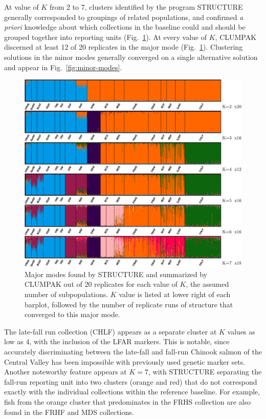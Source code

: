 At value of $K$ from 2 to 7, clusters identified by the program STRUCTURE
generally corresponded to groupings of related populations, and confirmed
{\em a priori} knowledge about which collections in the baseline could and should be
grouped together into reporting units (Fig.~\ref{fig:struct}).  At every value of $K$, CLUMPAK discerned at least
12 of 20 replicates in the major mode (Fig.~\ref{fig:struct}).   
Clustering solutions in the minor
modes generally converged on a single alternative solution and appear in Fig.~\ref{fig:minor-modes}.
\begin{figure}
\newcommand{\structcap}{\footnotesize Major modes found by STRUCTURE and summarized
by CLUMPAK out of 20 replicates for each value of $K$, the assumed number of
subpopulations. $K$ value is listed at lower right of each barplot, followed by the number
of replicate runs of structure that converged to this major mode.}
\begin{center}
\includegraphics[width=\columnwidth]{images/clumpak-crop.pdf}
\end{center}
\caption[\structcap]{\structcap}
\label{fig:struct}
\end{figure}
The late-fall run collection (CHLF) appears as a separate cluster at $K$ values
as low as 4, with the inclusion of the LFAR markers.  This is notable, since accurately discriminating between the late-fall and
fall-run Chinook salmon of the Central Valley has been impossible with previously used genetic marker sets.
Another noteworthy feature appears at $K=7$, with STRUCTURE separating the fall-run reporting unit
into two clusters (orange and red) that do not correspond exactly with the individual
collections within the reference baseline. For example, fish from the
orange cluster that predominates in the FRHS collection are also found in the FRHF and MDS collections.


